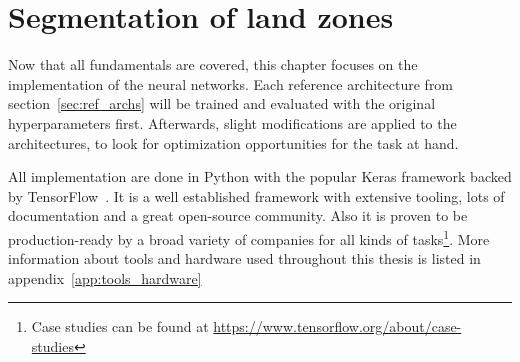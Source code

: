 \section{Segmentation of land zones}
\label{sec:segmentation}

Now that all fundamentals are covered, this chapter focuses on the implementation of the neural networks. Each reference architecture from section~\ref{sec:ref_archs} will be trained and evaluated with the original hyperparameters first. Afterwards, slight modifications are applied to the architectures, to look for optimization opportunities for the task at hand.

All implementation are done in Python with the popular Keras framework backed by TensorFlow~\cite{tf_whitepaper15}. It is a well established framework with extensive tooling, lots of documentation and a great open-source community. Also it is proven to be production-ready by a broad variety of companies for all kinds of tasks\footnote{Case studies can be found at \url{https://www.tensorflow.org/about/case-studies}}. More information about tools and hardware used throughout this thesis is listed in appendix~\ref{app:tools_hardware}

